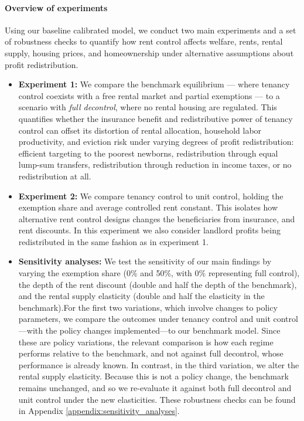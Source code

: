 \documentclass[parskip=full]{article}
\begin{document}
\paragraph{Overview of experiments}  
Using our baseline calibrated model, we conduct two main experiments and a set of robustness checks to quantify how rent control affects welfare, rents, rental supply, housing prices, and homeownership under alternative assumptions about profit redistribution.

\begin{itemize}
    \item \textbf{Experiment 1:} We compare the benchmark equilibrium — where tenancy control coexists with a free rental market and partial exemptions — to a scenario with \textit{full decontrol}, where no rental housing are regulated. This quantifies whether the insurance benefit and redistributive power of tenancy control can offset its distortion of rental allocation, household labor productivity, and eviction risk under varying degrees of profit redistribution: efficient targeting to the poorest newborns, redistribution through equal lump-sum transfers, redistribution through reduction in income taxes, or no redistribution at all.
    \item \textbf{Experiment 2:} We compare tenancy control to unit control, holding the exemption share and average controlled rent constant. This isolates how alternative rent control designs changes the beneficiaries from insurance, and rent discounts. In this experiment we also consider landlord profits being redistributed in the same fashion as in experiment 1.
    \item \textbf{Sensitivity analyses:} We test the sensitivity of our main findings by varying the exemption share (0\% and 50\%, with 0\% representing full control), the depth of the rent discount (double and half the depth of the benchmark), and the rental supply elasticity (double and half the elasticity in the benchmark).For the first two variations, which involve changes to policy parameters, we compare the outcomes under tenancy control and unit control—with the policy changes implemented—to our benchmark model. Since these are policy variations, the relevant comparison is how each regime performs relative to the benchmark, and not against full decontrol, whose performance is already known. In contrast, in the third variation, we alter the rental supply elasticity. Because this is not a policy change, the benchmark remains unchanged, and so we re-evaluate it against both full decontrol and unit control under the new elasticities. These robustness checks can be found in Appendix \ref{appendix:sensitivity_analyses}.
\end{itemize}
\end{document}

